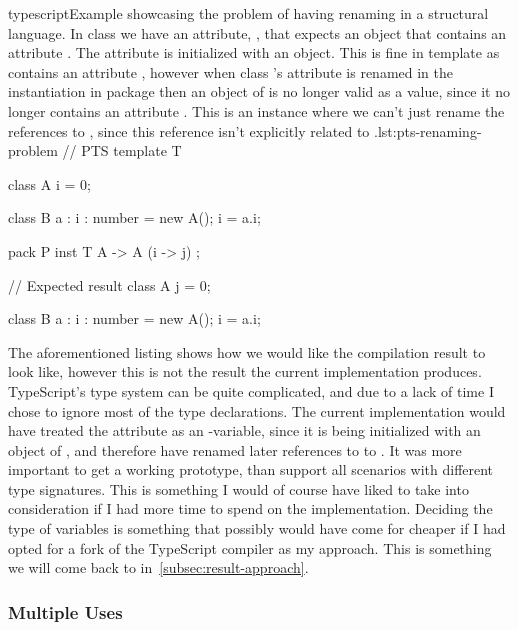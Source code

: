 \begin{code}{typescript}{Example showcasing the problem of having renaming in a structural language. In class  we have an attribute, , that expects an object that contains an attribute . The attribute is initialized with an  object. This is fine in template  as  contains an attribute , however when class 's attribute is renamed in the instantiation in package  then an object of  is no longer valid as a value, since it no longer contains an attribute . This is an instance where we can't just rename the references to , since this reference isn't explicitly related to .}{lst:pts-renaming-problem}
    // PTS
    template T {
        class A {
            i = 0;
        }

        class B {
            a : { i : number } = new A();
            i = a.i;
        }
    }

    pack P {
        inst T { A -> A (i -> j) };
    }

    // Expected result
    class A {
        j = 0;
    }

    class B {
        a : { i : number } = new A();
        i = a.i;
    }
\end{code}

The aforementioned listing shows how we would like the compilation result to look like, however this is not the result the current implementation produces.
TypeScript's type system can be quite complicated, and due to a lack of time I chose to ignore most of the type declarations.
The current implementation would have treated the attribute  as an -variable, since it is being initialized with an object of , and therefore have renamed later references to  to .
It was more important to get a working prototype, than support all scenarios with different type signatures.
This is something I would of course have liked to take into consideration if I had more time to spend on the implementation.
Deciding the type of variables is something that possibly would have come for cheaper if I had opted for a fork of the TypeScript compiler as my approach.
This is something we will come back to in~\vref{subsec:result-approach}.

\subsubsection{Multiple Uses}\label{subsubsec:pts-multiple-uses}

